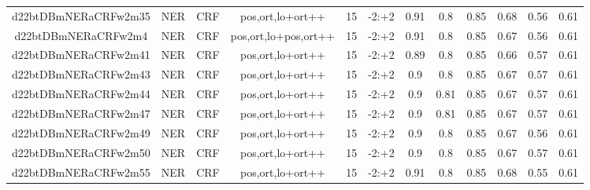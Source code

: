 \documentclass[a4paper]{article}
\begin{document}
\begin{landscape}
\begin{center}
\begin{tabular}{ |c|c|c|c|c|c|c|c|c|c|c|c|}
 
 	
 	\small{ d22btDBmNERaCRFw2m35 } & \small{ NER} & \small{  CRF }  & pos,ort,lo+ort++  &  15 &  \small{  -2:+2 }  &  0.91 & 0.8 & 0.85  &  0.68 & 0.56 & 0.61 \\
 	

 
 	
 	\small{ d22btDBmNERaCRFw2m4 } & \small{ NER} & \small{  CRF }  & pos,ort,lo+pos,ort++  &  15 &  \small{  -2:+2 }  &  0.91 & 0.8 & 0.85  &  0.67 & 0.56 & 0.61 \\
 	

 
 	
 	\small{ d22btDBmNERaCRFw2m41 } & \small{ NER} & \small{  CRF }  & pos,ort,lo+ort++  &  15 &  \small{  -2:+2 }  &  0.89 & 0.8 & 0.85  &  0.66 & 0.57 & 0.61 \\
 	

 
 	
 	\small{ d22btDBmNERaCRFw2m43 } & \small{ NER} & \small{  CRF }  & pos,ort,lo+ort++  &  15 &  \small{  -2:+2 }  &  0.9 & 0.8 & 0.85  &  0.67 & 0.57 & 0.61 \\
 	

 
 	
 	\small{ d22btDBmNERaCRFw2m44 } & \small{ NER} & \small{  CRF }  & pos,ort,lo+ort++  &  15 &  \small{  -2:+2 }  &  0.9 & 0.81 & 0.85  &  0.67 & 0.57 & 0.61 \\
 	

 
 	
 	\small{ d22btDBmNERaCRFw2m47 } & \small{ NER} & \small{  CRF }  & pos,ort,lo+ort++  &  15 &  \small{  -2:+2 }  &  0.9 & 0.81 & 0.85  &  0.67 & 0.57 & 0.61 \\
 	

 
 	
 	\small{ d22btDBmNERaCRFw2m49 } & \small{ NER} & \small{  CRF }  & pos,ort,lo+ort++  &  15 &  \small{  -2:+2 }  &  0.9 & 0.8 & 0.85  &  0.67 & 0.56 & 0.61 \\
 	

 
 	
 	\small{ d22btDBmNERaCRFw2m50 } & \small{ NER} & \small{  CRF }  & pos,ort,lo+ort++  &  15 &  \small{  -2:+2 }  &  0.9 & 0.8 & 0.85  &  0.67 & 0.57 & 0.61 \\
 	

 
 	
 	\small{ d22btDBmNERaCRFw2m55 } & \small{ NER} & \small{  CRF }  & pos,ort,lo+ort++  &  15 &  \small{  -2:+2 }  &  0.91 & 0.8 & 0.85  &  0.68 & 0.55 & 0.61 \\
 	


\end{tabular}
\end{center}
\end{landscape}
\end{document}
